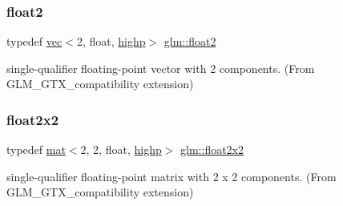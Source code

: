 \mbox{\label{group__gtx__compatibility_gaba973334bf704aa382f9b0dc06b59cf8}} 
\subsubsection{\texorpdfstring{float2}{float2}}
{\footnotesize\ttfamily typedef \mbox{\hyperlink{structglm_1_1vec}{vec}}$<$2, float, \mbox{\hyperlink{namespaceglm_a36ed105b07c7746804d7fdc7cc90ff25ac6f7eab42eacbb10d59a58e95e362074}{highp}}$>$ \mbox{\hyperlink{group__gtx__compatibility_gaba973334bf704aa382f9b0dc06b59cf8}{glm\+::float2}}}



single-\/qualifier floating-\/point vector with 2 components. (From G\+L\+M\+\_\+\+G\+T\+X\+\_\+compatibility extension) 

\mbox{\label{group__gtx__compatibility_gab3fb1cd56ec3f5407a4d3b9173bd88ae}} 
\subsubsection{\texorpdfstring{float2x2}{float2x2}}
{\footnotesize\ttfamily typedef \mbox{\hyperlink{structglm_1_1mat}{mat}}$<$2, 2, float, \mbox{\hyperlink{namespaceglm_a36ed105b07c7746804d7fdc7cc90ff25ac6f7eab42eacbb10d59a58e95e362074}{highp}}$>$ \mbox{\hyperlink{group__gtx__compatibility_gab3fb1cd56ec3f5407a4d3b9173bd88ae}{glm\+::float2x2}}}



single-\/qualifier floating-\/point matrix with 2 x 2 components. (From G\+L\+M\+\_\+\+G\+T\+X\+\_\+compatibility extension) 

\mbox{\label{group__gtx__compatibility_ga32644dc8b8177c22355e4d03b06061ac}} 
